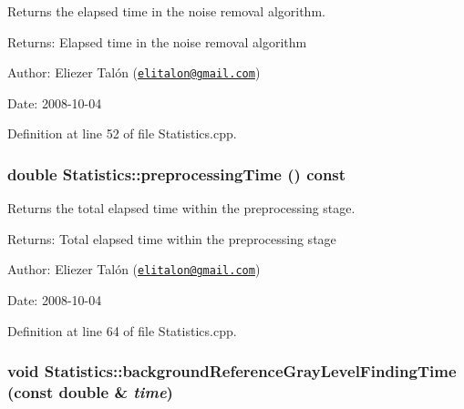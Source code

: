 Returns the elapsed time in the noise removal algorithm. 

\begin{Desc}
\item[Returns:]Elapsed time in the noise removal algorithm\end{Desc}
\begin{Desc}
\item[Author:]Eliezer Talón (\href{mailto:elitalon@gmail.com}{\tt elitalon@gmail.com}) \end{Desc}
\begin{Desc}
\item[Date:]2008-10-04 \end{Desc}


Definition at line 52 of file Statistics.cpp.\hypertarget{class_statistics_d88deb57349fedd7035ccffa06b4859b}{
\subsubsection[preprocessingTime]{\setlength{\rightskip}{0pt plus 5cm}double Statistics::preprocessingTime () const}}
\label{class_statistics_d88deb57349fedd7035ccffa06b4859b}


Returns the total elapsed time within the preprocessing stage. 

\begin{Desc}
\item[Returns:]Total elapsed time within the preprocessing stage\end{Desc}
\begin{Desc}
\item[Author:]Eliezer Talón (\href{mailto:elitalon@gmail.com}{\tt elitalon@gmail.com}) \end{Desc}
\begin{Desc}
\item[Date:]2008-10-04 \end{Desc}


Definition at line 64 of file Statistics.cpp.\hypertarget{class_statistics_f8a60e8a89be8fe8b2c46782681c1a2c}{
\subsubsection[backgroundReferenceGrayLevelFindingTime]{\setlength{\rightskip}{0pt plus 5cm}void Statistics::backgroundReferenceGrayLevelFindingTime (const double \& {\em time})}}
\label{class_statistics_f8a60e8a89be8fe8b2c46782681c1a2c}


